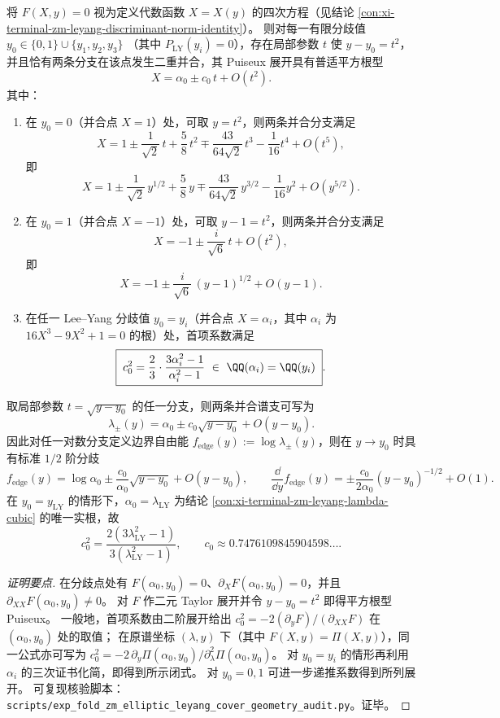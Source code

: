 \begin{conclusion}\label{con:xi-terminal-zm-branch-puiseux-uniformization}
将 \(F(X,y)=0\) 视为定义代数函数 \(X=X(y)\) 的四次方程（见结论 \ref{con:xi-terminal-zm-leyang-discriminant-norm-identity}）。
则对每一有限分歧值
\(
y_0\in\{0,1\}\cup\{y_1,y_2,y_3\}
\)
（其中 \(P_{\mathrm{LY}}(y_i)=0\)），存在局部参数 \(t\) 使 \(y-y_0=t^2\)，并且恰有两条分支在该点发生二重并合，其 Puiseux 展开具有普适平方根型
\[
X=\alpha_0\pm c_0\,t+O(t^2).
\]
其中：
\begin{enumerate}
  \item 在 \(y_0=0\)（并合点 \(X=1\)）处，可取 \(y=t^2\)，则两条并合分支满足
  \[
  X=1\pm \frac{1}{\sqrt2}\,t+\frac58\,t^2\mp \frac{43}{64\sqrt2}\,t^3-\frac{1}{16}t^4+O(t^5),
  \]
  即
  \[
  X=1\pm \frac{1}{\sqrt2}\,y^{1/2}+\frac58\,y\mp \frac{43}{64\sqrt2}\,y^{3/2}-\frac{1}{16}y^{2}+O(y^{5/2}).
  \]
  \item 在 \(y_0=1\)（并合点 \(X=-1\)）处，可取 \(y-1=t^2\)，则两条并合分支满足
  \[
  X=-1\pm \frac{i}{\sqrt6}\,t+O(t^2),
  \]
  即
  \[
  X=-1\pm \frac{i}{\sqrt6}\,(y-1)^{1/2}+O(y-1).
  \]
  \item 在任一 Lee--Yang 分歧值 \(y_0=y_i\)（并合点 \(X=\alpha_i\)，其中 \(\alpha_i\) 为 \(16X^3-9X^2+1=0\) 的根）处，首项系数满足
  \[
  \boxed{\;
  c_0^2=\frac{2}{3}\cdot\frac{3\alpha_i^2-1}{\alpha_i^2-1}\ \in\ \QQ(\alpha_i)=\QQ(y_i)\; }.
  \]
\end{enumerate}
\par
取局部参数 \(t=\sqrt{y-y_0}\) 的任一分支，则两条并合谱支可写为
\[
\lambda_{\pm}(y)=\alpha_0\pm c_0\sqrt{y-y_0}+O(y-y_0).
\]
因此对任一对数分支定义边界自由能 \(f_{\mathrm{edge}}(y):=\log\lambda_{\pm}(y)\)，则在 \(y\to y_0\) 时具有标准 \(1/2\) 阶分歧
\[
f_{\mathrm{edge}}(y)=\log\alpha_0\pm \frac{c_0}{\alpha_0}\sqrt{y-y_0}+O(y-y_0),
\qquad
\frac{\dd}{\dd y}f_{\mathrm{edge}}(y)=\pm \frac{c_0}{2\alpha_0}(y-y_0)^{-1/2}+O(1).
\]
在 \(y_0=y_{\mathrm{LY}}\) 的情形下，\(\alpha_0=\lambda_{\mathrm{LY}}\) 为结论 \ref{con:xi-terminal-zm-leyang-lambda-cubic} 的唯一实根，故
\[
c_0^2=\frac{2(3\lambda_{\mathrm{LY}}^{2}-1)}{3(\lambda_{\mathrm{LY}}^{2}-1)},
\qquad
c_0\approx 0.7476109845904598\ldots.
\]
\end{conclusion}
\begin{proof}[证明要点]
在分歧点处有 \(F(\alpha_0,y_0)=0\)、\(\partial_XF(\alpha_0,y_0)=0\)，并且 \(\partial_{XX}F(\alpha_0,y_0)\neq 0\)。
对 \(F\) 作二元 Taylor 展开并令 \(y-y_0=t^2\) 即得平方根型 Puiseux。
一般地，首项系数由二阶展开给出 \(c_0^2=-2(\partial_yF)/(\partial_{XX}F)\) 在 \((\alpha_0,y_0)\) 处的取值；
在原谱坐标 \((\lambda,y)\) 下（其中 \(F(X,y)=\Pi(X,y)\)），同一公式亦可写为
\(
c_0^2=-2\,\partial_y\Pi(\alpha_0,y_0)/\partial_{\lambda}^{2}\Pi(\alpha_0,y_0)
\)。
对 \(y_0=y_i\) 的情形再利用 \(\alpha_i\) 的三次证书化简，即得到所示闭式。
对 \(y_0=0,1\) 可进一步递推系数得到所列展开。
可复现核验脚本：\texttt{scripts/exp\_fold\_zm\_elliptic\_leyang\_cover\_geometry\_audit.py}。证毕。
\end{proof}

